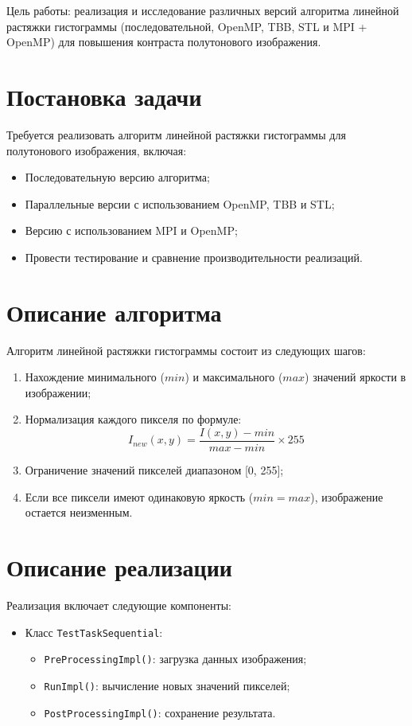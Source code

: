 \documentclass[14pt,a4paper]{extarticle}
\begin{document}
Цель работы: реализация и исследование различных версий алгоритма линейной растяжки гистограммы (последовательной, OpenMP, TBB, STL и MPI + OpenMP) для повышения контраста полутонового изображения.

\section{Постановка задачи}

Требуется реализовать алгоритм линейной растяжки гистограммы для полутонового изображения, включая:

\begin{itemize}
    \item Последовательную версию алгоритма;
    \item Параллельные версии с использованием OpenMP, TBB и STL;
    \item Версию с использованием MPI и OpenMP;
    \item Провести тестирование и сравнение производительности реализаций.
\end{itemize}

\section{Описание алгоритма}

Алгоритм линейной растяжки гистограммы состоит из следующих шагов:

\begin{enumerate}
    \item Нахождение минимального ($min$) и максимального ($max$) значений яркости в изображении;
    \item Нормализация каждого пикселя по формуле:
    \[
    I_{new}(x,y) = \frac{I(x,y) - min}{max - min} \times 255
    \]
    \item Ограничение значений пикселей диапазоном [0, 255];
    \item Если все пиксели имеют одинаковую яркость ($min = max$), изображение остается неизменным.
\end{enumerate}

\section{Описание реализации}

Реализация включает следующие компоненты:

\begin{itemize}
    \item Класс \texttt{TestTaskSequential}:
    \begin{itemize}
        \item \texttt{PreProcessingImpl()}: загрузка данных изображения;
        \item \texttt{RunImpl()}: вычисление новых значений пикселей;
        \item \texttt{PostProcessingImpl()}: сохранение результата.
    \end{itemize}
\end{itemize}
\end{document}
